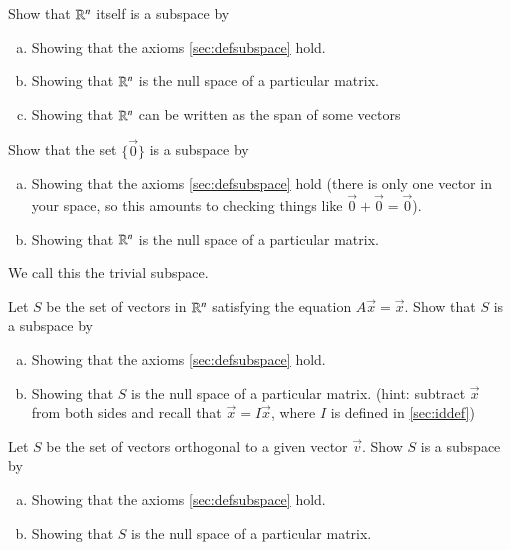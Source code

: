 \begin{EasyEx}
  Show that $\mathbb{R}^n$ itself is a subspace by
  \begin{enumerate}[a)]
  \item Showing that the axioms \ref{sec:defsubspace} hold.
  \item Showing that $\mathbb{R}^n$ is the null space of a particular matrix.  
  \item Showing that $\mathbb{R}^n$ can be written as the span of some vectors
  \end{enumerate}
\end{EasyEx}

\begin{EasyEx}
  Show that the set $\{\vec{0}\}$ is a subspace by
  \begin{enumerate}[a)]
  \item Showing that the axioms \ref{sec:defsubspace} hold (there is only one vector in your space, so this amounts to checking things like $\vec{0}+\vec{0}=\vec{0}$).  
  \item Showing that $\mathbb{R}^n$ is the null space of a particular matrix.  
  \end{enumerate}
  We call this the trivial subspace.  
\end{EasyEx}

\begin{Ex}
  Let $S$ be the set of vectors in $\mathbb{R}^n$ satisfying the equation $A\vec{x}=\vec{x}$.
  Show that $S$ is a subspace by
  \begin{enumerate}[a)]
  \item Showing that the axioms \ref{sec:defsubspace} hold.
  \item Showing that $S$ is the null space of a particular matrix. (hint: subtract $\vec{x}$ from both sides and recall that $\vec{x} = I\vec{x}$, where $I$ is defined in \ref{sec:iddef})
  \end{enumerate}
\end{Ex}

\begin{Ex}
  Let $S$ be the set of vectors orthogonal to a given vector $\vec{v}$.
  Show $S$ is a subspace by
  \begin{enumerate}[a)]
  \item Showing that the axioms \ref{sec:defsubspace} hold.
  \item Showing that $S$ is the null space of a particular matrix.  
  \end{enumerate}
\end{Ex}

